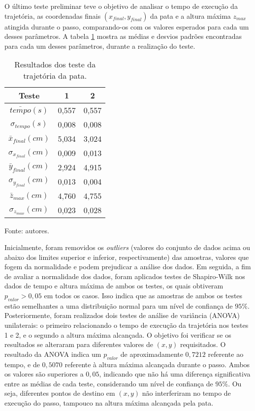\documentclass[../main.tex]{subfiles}
\begin{document}
  O último teste preliminar teve o objetivo de analisar o tempo de execução da trajetória, as coordenadas finais $(x_{final}, y_{final})$ da pata e a altura máxima $z_{max}$ atingida durante o passo, comparando-os com os valores esperados para cada um desses parâmetros. A tabela \ref{tab:trajetoria} mostra as médias e desvios padrões encontradas para cada um desses parâmetros, durante a realização do teste.

  \begin{table}[!htb]
    \caption{Resultados dos teste da trajetória da pata.}
    \centering
    \begin{tabular}{ccc}
      \hline
      \textbf{Teste} & \textbf{1}      & \textbf{2}  \\
      \hline
      $\bar{tempo} (s)$         & 0,557  & 0,557 \\
      \hline
      $\sigma_{tempo} (s)$       & 0,008  & 0,008 \\
      \hline
      $\bar{x}_{final} (cm)$     & 5,034  & 3,024 \\
      \hline
      $\sigma_{x_{final}} (cm)$  & 0,009  & 0,013 \\
      \hline
      $\bar{y}_{final} (cm)$     & 2,924  & 4,915 \\      
      \hline
      $\sigma_{y_{final}} (cm)$  & 0,013  & 0,004 \\      
      \hline
      $\bar{z}_{max} (cm)$       & 4,760  & 4,755 \\      
      \hline
      $\sigma_{z_{max}} (cm)$    & 0,023  & 0,028 \\
      \hline   
    \end{tabular}

    Fonte: autores.
    \vspace{-\baselineskip}
    \label{tab:trajetoria}
  \end{table}
  

  Inicialmente, foram removidos os \textit{outliers} (valores do conjunto de dados acima ou abaixo dos limites superior e inferior, respectivamente) das amostras, valores que fogem da normalidade e podem prejudicar a análise dos dados. Em seguida, a fim de avaliar a normalidade dos dados, foram aplicados testes de Shapiro-Wilk nos dados de tempo e altura máxima de ambos os testes, os quais obtiveram $p_{valor} > 0,05$ em todos os casos. Isso indica que as amostras de ambos os testes estão semelhantes a uma distribuição normal para um nível de confiança de $95\%$. Posteriormente, foram realizados dois testes de análise de variância (ANOVA) unilaterais: o primeiro relacionando o tempo de execução da trajetória nos testes 1 e 2, e o segundo a altura máxima alcançada. O objetivo foi verificar se os resultados se alteraram para diferentes valores de $(x, y)$ requisitados. O resultado da ANOVA indica um $p_{valor}$ de aproximadamente $0,7212$ referente ao tempo, e de $0,5070$ referente à altura máxima alcançada durante o passo. Ambos os valores são superiores a $0,05$, indicando que não há uma diferença significativa entre as médias de cada teste, considerando um nível de confiança de $95\%$. Ou seja, diferentes pontos de destino em $(x, y)$ não interferiram no tempo de execução do passo, tampouco na altura máxima alcançada pela pata.
\end{document}
